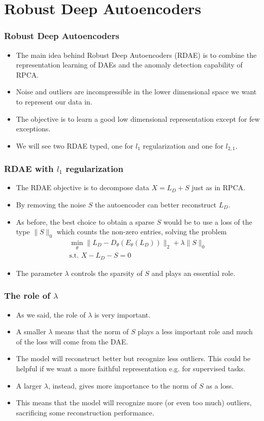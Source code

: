 \documentclass{beamer}
\theoremstyle{plain}
\theoremstyle{definition}
\theoremstyle{remark}
\newcommand{\norm}[1]{\lVert#1\rVert}
\begin{document}
\section{Robust Deep Autoencoders}

\begin{frame}
	\frametitle{Robust Deep Autoencoders}
	\begin{itemize}
		\item The main idea behind Robust Deep Autoencoders (RDAE) is to combine the representation learning of DAEs and the anomaly detection capability of RPCA.
		\item Noise and outliers are incompressible in the lower dimensional space we want to represent our data in.
		\item The objective is to learn a good low dimensional representation except for few exceptions.
		\item We will see two RDAE typed, one for $l_1$ regularization and one for $l_{2,1}$.
	\end{itemize}
\end{frame}

\begin{frame}
	\frametitle{RDAE with $l_1$ regularization}
	\begin{itemize}
		\item The RDAE objective is to decompose data $X=L_D+S$ just as in RPCA.
		\item By removing the noise $S$ the autoencoder can better reconstruct $L_D$.
		\item As before, the best choice to obtain a sparse $S$ would be to use a loss of the type $\norm{S}_0$ which counts the non-zero entries, solving the problem
			\begin{align}
				\min_{\theta}{\norm{L_D -D_{\theta}(E_{\theta}(L_D))}_2 + \lambda\norm{S}_0}\\
				\text{s.t. }X-L_D-S=0  
			\end{align}
		\item The parameter $\lambda$ controls the sparsity of $S$ and plays an essential role.
	\end{itemize}
\end{frame}

\begin{frame}
	\frametitle{The role of $\lambda$}
	\begin{itemize}
		\item As we said, the role of $\lambda$ is very important.
		\item A smaller $\lambda$ means that the norm of $S$ plays a less important role and much of the loss will come from the DAE.
		\item The model will reconstruct better but recognize less outliers. This could be helpful if we want a more faithful representation e.g. for supervised tasks.
		\item A larger $\lambda$, instead, gives more importance to the norm of $S$ as a loss.
		\item This means that the model will recognize more (or even too much) outliers, sacrificing some reconstruction performance.
	\end{itemize}
\end{frame}
\end{document}

